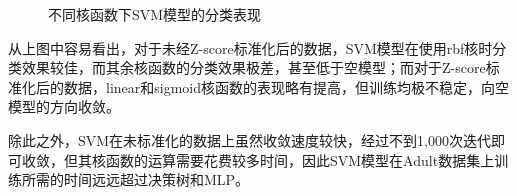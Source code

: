 \documentclass[12pt,a4paper]{article}
\theoremstyle{definition}
\begin{document}
\begin{figure}[H]
	\centering
	\caption{不同核函数下SVM模型的分类表现}
	\label{fig:svm-kernel1}
\end{figure}

\vspace{0.01\linewidth}
从上图中容易看出，对于未经Z-score标准化后的数据，SVM模型在使用rbf核时分类效果较佳，而其余核函数的分类效果极差，甚至低于空模型；而对于Z-score标准化后的数据，linear和sigmoid核函数的表现略有提高，但训练均极不稳定，向空模型的方向收敛。

\vspace{0.01\linewidth}
除此之外，SVM在未标准化的数据上虽然收敛速度较快，经过不到1,000次迭代即可收敛，但其核函数的运算需要花费较多时间，因此SVM模型在Adult数据集上训练所需的时间远远超过决策树和MLP。
\end{document}
